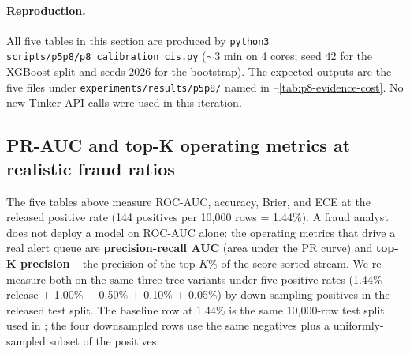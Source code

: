 \paragraph{Reproduction.} All five tables in this section are produced
by \texttt{python3 scripts/p5p8/p8\_calibration\_cis.py} ($\sim$3 min on
4 cores; seed $42$ for the XGBoost split and seeds $2026$ for the
bootstrap). The expected outputs are the five files under
\texttt{experiments/results/p5p8/} named in
--\ref{tab:p8-evidence-cost}. No new
Tinker API calls were used in this iteration.

\subsection{PR-AUC and top-K operating metrics at realistic fraud ratios}
\label{sec:p8-evidence-realistic-ratios}

The five tables above measure ROC-AUC, accuracy, Brier, and ECE at the
released positive rate (144 positives per 10{,}000 rows = 1.44\%). A
fraud analyst does not deploy a model on ROC-AUC alone: the operating
metrics that drive a real alert queue are \textbf{precision-recall AUC}
(area under the PR curve) and \textbf{top-K precision} -- the precision
of the top $K\%$ of the score-sorted stream. We re-measure both on the
same three tree variants under five positive rates (1.44\% release +
1.00\% + 0.50\% + 0.10\% + 0.05\%) by down-sampling positives in the
released test split. The baseline row at 1.44\% is the same 10{,}000-row
test split used in ; the four downsampled
rows use the same negatives plus a uniformly-sampled subset of the
positives.

